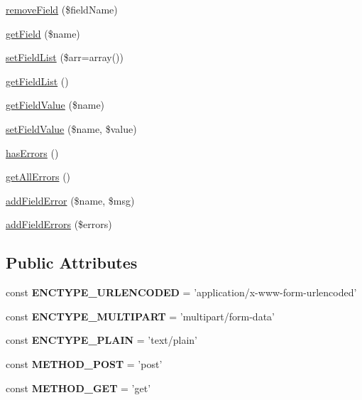 \begin{DoxyCompactItemize}
\item 
\hyperlink{classTk_1_1Form_a2a11f4b75c432508f3ad29b3e4e1e0bc}{remove\+Field} (\$field\+Name)
\item 
\hyperlink{classTk_1_1Form_a6e5befa1ff20bfc86c3427a693d752e7}{get\+Field} (\$name)
\item 
\hyperlink{classTk_1_1Form_a0b5e39683e89cb3ea419969833f5407d}{set\+Field\+List} (\$arr=array())
\item 
\hyperlink{classTk_1_1Form_a94e79b6019f09549be8ac2b5620d0105}{get\+Field\+List} ()
\item 
\hyperlink{classTk_1_1Form_ae03b790641d33cf213092c7b5bbf4174}{get\+Field\+Value} (\$name)
\item 
\hyperlink{classTk_1_1Form_a8857cc531cc7603af37676d33ef7663d}{set\+Field\+Value} (\$name, \$value)
\item 
\hyperlink{classTk_1_1Form_afa198380530a6523e14e1e97a9b0bc70}{has\+Errors} ()
\item 
\hyperlink{classTk_1_1Form_a23f6d1c45ce31a6e203a66ad686f5283}{get\+All\+Errors} ()
\item 
\hyperlink{classTk_1_1Form_a43e37546960eaf71ce3b5e8636d25234}{add\+Field\+Error} (\$name, \$msg)
\item 
\hyperlink{classTk_1_1Form_a33777899fb9ad9b5c7ddb7f01cef5904}{add\+Field\+Errors} (\$errors)
\end{DoxyCompactItemize}
\subsection*{Public Attributes}
\begin{DoxyCompactItemize}
\item 
\hypertarget{classTk_1_1Form_a384f7f2e18317e64af46ba6cfe8b2f9b}{const {\bfseries E\+N\+C\+T\+Y\+P\+E\+\_\+\+U\+R\+L\+E\+N\+C\+O\+D\+E\+D} = 'application/x-\/www-\/form-\/urlencoded'}\label{classTk_1_1Form_a384f7f2e18317e64af46ba6cfe8b2f9b}

\item 
\hypertarget{classTk_1_1Form_acfa66dcef632e23b257c5a4a2fba13d7}{const {\bfseries E\+N\+C\+T\+Y\+P\+E\+\_\+\+M\+U\+L\+T\+I\+P\+A\+R\+T} = 'multipart/form-\/data'}\label{classTk_1_1Form_acfa66dcef632e23b257c5a4a2fba13d7}

\item 
\hypertarget{classTk_1_1Form_a735b3dfc7c580719ab51784cb1acdfd5}{const {\bfseries E\+N\+C\+T\+Y\+P\+E\+\_\+\+P\+L\+A\+I\+N} = 'text/plain'}\label{classTk_1_1Form_a735b3dfc7c580719ab51784cb1acdfd5}

\item 
\hypertarget{classTk_1_1Form_a1e75e9ce94aee02b760b607701b64b96}{const {\bfseries M\+E\+T\+H\+O\+D\+\_\+\+P\+O\+S\+T} = 'post'}\label{classTk_1_1Form_a1e75e9ce94aee02b760b607701b64b96}

\item 
\hypertarget{classTk_1_1Form_a4d6c69380b555b3948fea5b35eb75df5}{const {\bfseries M\+E\+T\+H\+O\+D\+\_\+\+G\+E\+T} = 'get'}\label{classTk_1_1Form_a4d6c69380b555b3948fea5b35eb75df5}

\end{DoxyCompactItemize}
